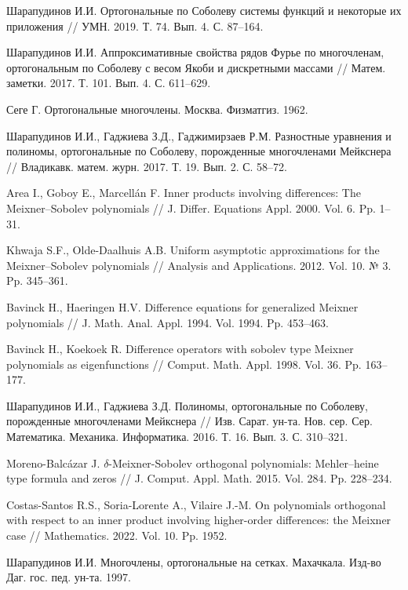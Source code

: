 \begin{thebibliography}{111}
{Шарапудинов И.И.} Ортогональные по Соболеву системы функций и некоторые их приложения // УМН. 2019. Т. 74. Вып. 4. С. 87--164.

{Шарапудинов И.И.} Аппроксимативные свойства рядов Фурье по многочленам, ортогональным по Соболеву с весом Якоби и дискретными массами // Матем. заметки. 2017. Т. 101. Вып. 4. С. 611--629.	
	
{Сеге Г.} Ортогональные многочлены. Москва. Физматгиз. 1962.	

{Шарапудинов И.И., Гаджиева З.Д., Гаджимирзаев Р.М.} Разностные уравнения и полиномы, ортогональные по Соболеву, порожденные многочленами Мейкснера //  Владикавк. матем. журн. 2017. Т. 19. Вып. 2. С. 58--72.

{Area I., Goboy E., Marcell\'an F.} Inner products involving differences: The Meixner–Sobolev polynomials // J. Differ. Equations Appl. 2000. Vol. 6. Pp. 1--31.

{Khwaja S.F., Olde-Daalhuis A.B.} Uniform asymptotic approximations for the Meixner–Sobolev polynomials // Analysis and Applications. 2012. Vol. 10. № 3. Pp. 345--361.

{Bavinck H., Haeringen H.V.} Difference equations for generalized Meixner polynomials // J. Math. Anal. Appl. 1994. Vol. 1994. Pp. 453--463.

{Bavinck H., Koekoek R.} Difference operators with sobolev type Meixner polynomials as eigenfunctions // Comput. Math. Appl. 1998. Vol. 36. Pp. 163--177.

{Шарапудинов И.И., Гаджиева З.Д.} Полиномы, ортогональные по Соболеву, порожденные многочленами Мейкснера // Изв. Сарат. ун-та. Нов. сер. Сер. Математика. Механика. Информатика. 2016. Т. 16. Вып. 3. С. 310--321.

{Moreno-Balc\'azar J.} $\delta$-Meixner-Sobolev orthogonal polynomials: Mehler–heine type formula and zeros // J. Comput. Appl. Math. 2015. Vol. 284. Pp. 228--234.

{Costas-Santos R.S., Soria-Lorente A., Vilaire J.-M.} On polynomials orthogonal with respect to an inner product involving higher-order differences: the Meixner case // Mathematics. 2022. Vol. 10. Pp. 1952.

{Шарапудинов И.И.} Многочлены, ортогональные на сетках. Махачкала. Изд-во Даг. гос. пед. ун-та. 1997.


\end{thebibliography}
